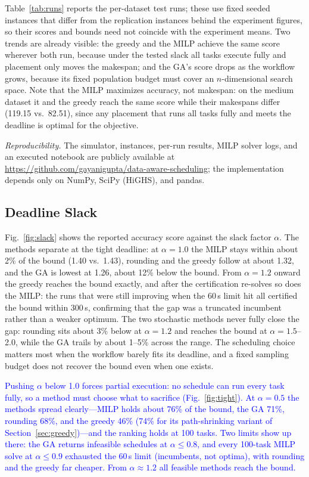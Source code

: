 \documentclass[conference]{IEEEtran}
\newcommand{\rev}[1]{\textcolor{blue}{#1}}%
\begin{document}
Table~\ref{tab:runs} reports the per-dataset test runs; these use fixed
seeded instances that differ from the replication instances behind the
experiment figures, so their scores and bounds need not coincide with the
experiment means.
Two trends are already visible: the greedy and the MILP achieve the same
score wherever both run, because under the tested slack all tasks execute
fully and placement only moves the makespan; and the GA's score drops as
the workflow grows, because its fixed population budget must cover an
$n$-dimensional search space. Note that the MILP maximizes accuracy, not
makespan: on the medium dataset it and the greedy reach the same score
while their makespans differ (119.15 vs.\ 82.51), since any placement that
runs all tasks fully and meets the deadline is optimal for the objective.

\emph{Reproducibility.} The simulator, instances, per-run results, MILP solver logs, and an executed notebook are publicly available at \url{https://github.com/gayanigupta/data-aware-scheduling}; the implementation depends only on NumPy, SciPy (HiGHS), and pandas.

\subsection{Deadline Slack}

Fig.~\ref{fig:slack} shows the reported accuracy score against the slack factor $\alpha$. The methods separate at the tight deadline: at $\alpha=1.0$ the MILP stays within about 2\% of the bound (1.40 vs.\ 1.43), rounding and the greedy follow at about 1.32, and the GA is lowest at 1.26, about 12\% below the bound. From $\alpha=1.2$ onward the greedy reaches the bound exactly, and after the certification re-solves so does the MILP: the runs that were still improving when the 60\,s limit hit all certified the bound within 300\,s, confirming that the gap was a truncated incumbent rather than a weaker optimum. The two stochastic methods never fully close the gap: rounding sits about 3\% below at $\alpha=1.2$ and reaches the bound at $\alpha=1.5$--2.0, while the GA trails by about 1--5\% across the range. The scheduling choice matters most when the workflow barely fits its deadline, and a fixed sampling budget does not recover the bound even when one exists.

\rev{Pushing $\alpha$ below 1.0 forces partial execution: no schedule can run every task fully, so a method must choose what to sacrifice (Fig.~\ref{fig:tight}). At $\alpha=0.5$ the methods spread clearly---MILP holds about 76\% of the bound, the GA 71\%, rounding 68\%, and the greedy 46\% (74\% for its path-shrinking variant of Section~\ref{sec:greedy})---and the ranking holds at 100 tasks. Two limits show up there: the GA returns infeasible schedules at $\alpha\le0.8$, and every 100-task MILP solve at $\alpha\le0.9$ exhausted the 60\,s limit (incumbents, not optima), with rounding and the greedy far cheaper. From $\alpha\approx1.2$ all feasible methods reach the bound.}
\end{document}
